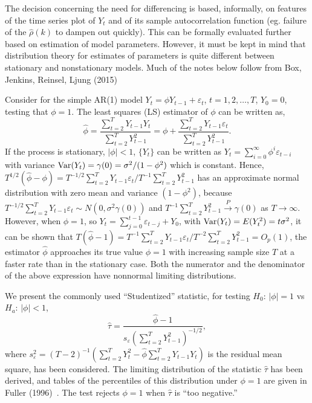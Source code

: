The decision concerning the need for differencing is based, informally, on features of the time series plot of $Y_t$ and of its sample autocorrelation function (eg. failure of the $\hat{\rho}(k)$ to dampen out quickly). This can be formally evaluated further based on estimation of model parameters. However, it must be kept in mind that distribution theory for estimates of parameters is quite different between stationary and nonstationary models. Much of the notes below follow from Box, Jenkins, Reinsel, Ljung (2015)~\cite{ljung15}


Consider for the simple AR(1) model $Y_t = \phi Y_{t-1} + \varepsilon_t$, $t = 1,2, \ldots, T$, $Y_0 = 0$, testing that $\phi = 1$. The least squares (LS) estimator of $\phi$ can be written as,
	\begin{equation} \label{eqn:futurereffirst}
	\hat{\phi} = \dfrac{\sum_{t=2}^T Y_{t-1}Y_t}{\sum_{t=2}^T Y_{t-1}^2} = \phi + \dfrac{\sum_{t=2}^T Y_{t-1}\varepsilon_t}{\sum_{t=2}^T Y_{t-1}^2}.
	\end{equation}
If the process is stationary, $\lvert \phi \rvert< 1$, $\{ Y_t \}$ can be written as $Y_t = \sum_{i=0}^\infty \phi^i \varepsilon_{t-i}$ with variance $\operatorname{Var}(Y_t) = \gamma(0) = \sigma^2/(1-\phi^2)$ which is constant. Hence, $T^{1/2}(\hat{\phi} - \phi) = T^{-1/2}\sum_{t=2}^T Y_{t-1}\varepsilon_t/T^{-1}\sum_{t=2}^TY_{t-1}^2$ has an approximate normal distribution with zero mean and variance $(1 - \phi^2)$, because $T^{-1/2}\sum_{t=2}^T Y_{t-1} \varepsilon_t \sim N(0,\sigma^2 \gamma(0))$ and $T^{-1} \sum_{t=2}^T Y_{t-1}^2 \xrightarrow{P} \gamma(0)$ as $T \to \infty$. However, when $\phi = 1$, so $Y_t = \sum_{j=0}^{t-1}\varepsilon_{t-j} + Y_0$, with $\operatorname{Var}(Y_t) = E(Y_t^2) = t \sigma^2$, it can be shown that $T(\hat{\phi} - 1) = T^{-1} \sum_{t=2}^T Y_{t-1} \varepsilon_t/T^{-2} \sum_{t=2}^T Y_{t-1}^2 = O_p(1)$, the estimator $\hat{\phi}$ approaches its true value $\phi = 1$ with increasing sample size $T$ at a faster rate than in the stationary case. Both the numerator and the denominator of the above expression have nonnormal limiting distributions. 


We present the commonly used ``Studentized'' statistic, for testing $H_0: \, \lvert \phi \rvert=1$ vs $H_a: \, \lvert \phi \rvert < 1$,
	\begin{equation} \label{eqn:hattaunew}
	\hat{\tau} = \dfrac{\hat{\phi} - 1}{s_{\varepsilon} \left( \sum_{t=2}^T Y_{t-1}^2 \right)^{-1/2}},
	\end{equation}
where $s_\varepsilon^2 = (T - 2)^{-1} (\sum_{t=2}^T Y_t^2 - \hat{\phi} \sum_{t=2}^T Y_{t-1} Y_t)$ is the residual mean square, has been considered. The limiting distribution of the statistic $\hat{\tau}$ has been derived, and tables of the percentiles of this distribution under $\phi = 1$ are given in Fuller (1996)~\cite{fuller1996}. The test rejects $\phi = 1$ when $\hat{\tau}$ is ``too negative.''


